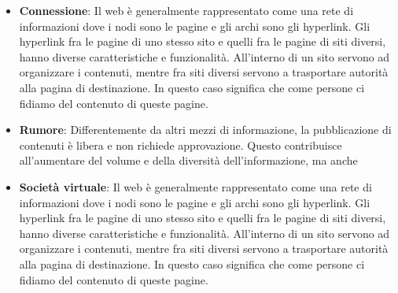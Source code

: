 \begin{itemize}
\item \textbf{Connessione}: Il web è generalmente rappresentato come una rete di informazioni dove i nodi sono le pagine e gli archi sono gli hyperlink. Gli hyperlink fra le pagine di uno stesso sito e quelli fra le pagine di siti diversi, hanno diverse caratteristiche e funzionalità. All'interno di un sito servono ad organizzare i contenuti, mentre fra siti diversi servono a trasportare autorità alla pagina di destinazione. In questo caso significa che come persone ci fidiamo del contenuto di queste pagine.

\item \textbf{Rumore}: 
Differentemente da altri mezzi di informazione, la pubblicazione di contenuti è libera e non richiede approvazione. Questo contribuisce all'aumentare del volume e della diversità dell'informazione, ma anche

\item \textbf{Società virtuale}: Il web è generalmente rappresentato come una rete di informazioni dove i nodi sono le pagine e gli archi sono gli hyperlink. Gli hyperlink fra le pagine di uno stesso sito e quelli fra le pagine di siti diversi, hanno diverse caratteristiche e funzionalità. All'interno di un sito servono ad organizzare i contenuti, mentre fra siti diversi servono a trasportare autorità alla pagina di destinazione. In questo caso significa che come persone ci fidiamo del contenuto di queste pagine.

\end{itemize}

